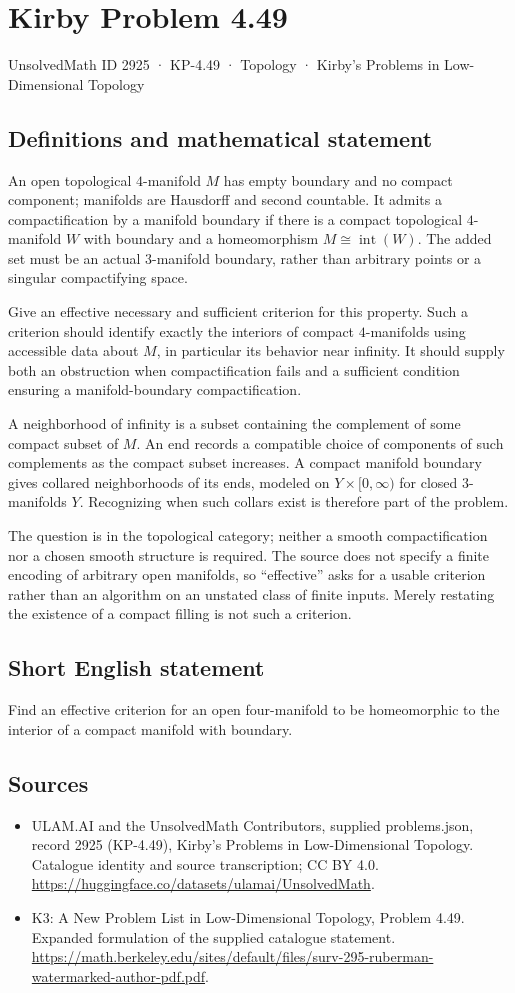 \documentclass[11pt,a4paper]{article}
\begin{document}
\section*{Kirby Problem 4.49}\label{2925}
{\small UnsolvedMath ID 2925 · KP-4.49 · Topology · Kirby's Problems in Low-Dimensional Topology}
\subsection{Definitions and mathematical statement}
An open topological $4$-manifold $M$ has empty boundary and no compact
component; manifolds are Hausdorff and second countable. It admits a
compactification by a manifold boundary if there is a compact topological
$4$-manifold $W$ with boundary and a homeomorphism
$M\cong\operatorname{int}(W)$. The added set must be an actual
$3$-manifold boundary, rather than arbitrary points or a singular
compactifying space.

Give an effective necessary and sufficient criterion for this property.
Such a criterion should identify exactly the interiors of compact
$4$-manifolds using accessible data about $M$, in particular its behavior
near infinity. It should supply both an obstruction when compactification
fails and a sufficient condition ensuring a manifold-boundary
compactification.

A neighborhood of infinity is a subset containing the complement of
some compact subset of $M$. An end records a compatible choice of
components of such complements as the compact subset increases.
A compact manifold boundary gives collared neighborhoods of its ends,
modeled on $Y\times[0,\infty)$ for closed $3$-manifolds $Y$.
Recognizing when such collars exist is therefore part of the problem.

The question is in the topological category; neither a smooth
compactification nor a chosen smooth structure is required. The source
does not specify a finite encoding of arbitrary open manifolds, so
``effective'' asks for a usable criterion rather than an algorithm
on an unstated class of finite inputs. Merely restating the existence
of a compact filling is not such a criterion.
\subsection{Short English statement}
Find an effective criterion for an open four-manifold to be homeomorphic to the interior of a compact manifold with boundary.
\subsection{Sources}
\begin{itemize}
\item[S1] ULAM.AI and the UnsolvedMath Contributors, supplied problems.json, record 2925 (KP-4.49), Kirby's Problems in Low-Dimensional Topology. Catalogue identity and source transcription; CC BY 4.0.
\url{https://huggingface.co/datasets/ulamai/UnsolvedMath}.
\item[S2] K3: A New Problem List in Low-Dimensional Topology, Problem 4.49. Expanded formulation of the supplied catalogue statement.
\url{https://math.berkeley.edu/sites/default/files/surv-295-ruberman-watermarked-author-pdf.pdf}.
\end{itemize}
\end{document}

